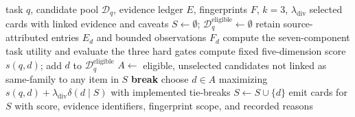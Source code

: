 \documentclass[conference]{IEEEtran}
\begin{document}
\begin{algorithm}[t]
\caption{Evidence-linked recommendation from a supplied candidate pool}
\label{alg:pipeline}
\footnotesize
\begin{algorithmic}[1]
\Require task $q$, candidate pool $\mathcal{D}_q$, evidence ledger $E$, fingerprints $F$, $k=3$, $\lambda_{\mathrm{div}}$
\Ensure selected cards with linked evidence and caveats
\State $S\gets\emptyset$; $\mathcal{D}_q^{\mathrm{eligible}}\gets\emptyset$
  \State retain source-attributed entries $E_d$ and bounded observations $F_d$
  \State compute the seven-component task utility and evaluate the three hard gates
    \State compute fixed five-dimension score $s(q,d)$; add $d$ to $\mathcal{D}_q^{\mathrm{eligible}}$
  \EndIf
\EndFor
{}
  \State $A\gets$ eligible, unselected candidates not linked as same-family to any item in $S$
   \State \textbf{break} \EndIf
  \State choose $d\in A$ maximizing $s(q,d)+\lambda_{\mathrm{div}}\delta(d\mid S)$ with implemented tie-breaks
  \State $S\gets S\cup\{d\}$
\EndWhile
\State emit cards for $S$ with score, evidence identifiers, fingerprint scope, and recorded reasons
\end{algorithmic}
\end{algorithm}
\end{document}
